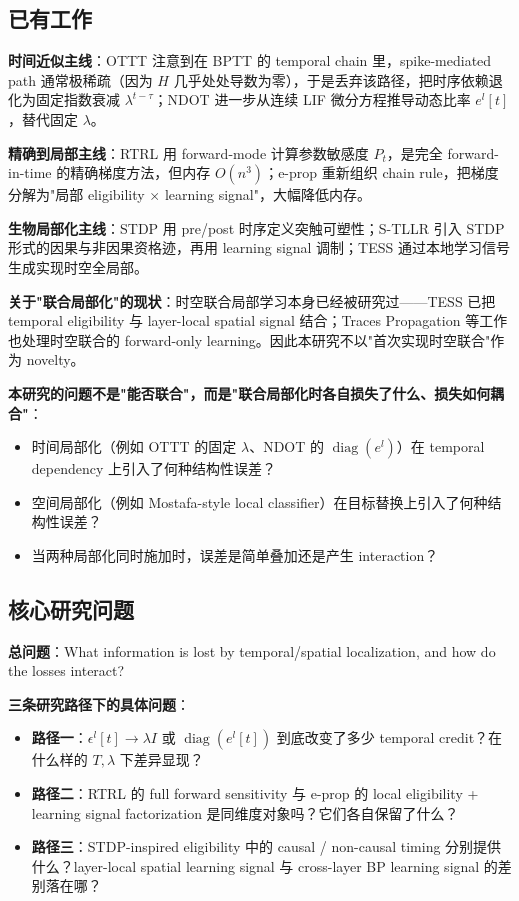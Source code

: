 \documentclass[journal,12pt,onecolumn]{IEEEtran}
\begin{document}
\subsection{已有工作}

\textbf{时间近似主线}：OTTT \cite{xiao_online_2022} 注意到在 BPTT 的 temporal chain 里，spike-mediated path 通常极稀疏（因为 $H$ 几乎处处导数为零），于是丢弃该路径，把时序依赖退化为固定指数衰减 $\lambda^{t-\tau}$；NDOT \cite{jiang_ndot_nodate} 进一步从连续 LIF 微分方程推导动态比率 $e^l[t]$，替代固定 $\lambda$。

\textbf{精确到局部主线}：RTRL \cite{williams1989learning} 用 forward-mode 计算参数敏感度 $P_t$，是完全 forward-in-time 的精确梯度方法，但内存 $O(n^3)$；e-prop \cite{bellec_solution_2020} 重新组织 chain rule，把梯度分解为"局部 eligibility $\times$ learning signal"，大幅降低内存。

\textbf{生物局部化主线}：STDP 用 pre/post 时序定义突触可塑性；S-TLLR \cite{apolinario_s-tllr_2024} 引入 STDP 形式的因果与非因果资格迹，再用 learning signal 调制；TESS \cite{apolinario_tess_2025} 通过本地学习信号生成实现时空全局部。

\textbf{关于"联合局部化"的现状}：时空联合局部学习本身已经被研究过——TESS \cite{apolinario_tess_2025} 已把 temporal eligibility 与 layer-local spatial signal 结合；Traces Propagation 等工作也处理时空联合的 forward-only learning。因此本研究不以"首次实现时空联合"作为 novelty。

\textbf{本研究的问题不是"能否联合"，而是"联合局部化时各自损失了什么、损失如何耦合"}：
\begin{itemize}[leftmargin=1.5em,itemsep=0pt]
\item 时间局部化（例如 OTTT 的固定 $\lambda$、NDOT 的 $\operatorname{diag}(e^l)$）在 temporal dependency 上引入了何种结构性误差？
\item 空间局部化（例如 Mostafa-style local classifier）在目标替换上引入了何种结构性误差？
\item 当两种局部化同时施加时，误差是简单叠加还是产生 interaction？
\end{itemize}

\subsection{核心研究问题}

\textbf{总问题}：What information is lost by temporal/spatial localization, and how do the losses interact?

\textbf{三条研究路径下的具体问题}：
\begin{itemize}[leftmargin=1.5em,itemsep=0pt]
\item \textbf{路径一}：$\epsilon^l[t]\to\lambda I$ 或 $\operatorname{diag}(e^l[t])$ 到底改变了多少 temporal credit？在什么样的 $T,\lambda$ 下差异显现？
\item \textbf{路径二}：RTRL 的 full forward sensitivity 与 e-prop 的 local eligibility + learning signal factorization 是同维度对象吗？它们各自保留了什么？
\item \textbf{路径三}：STDP-inspired eligibility 中的 causal / non-causal timing 分别提供什么？layer-local spatial learning signal 与 cross-layer BP learning signal 的差别落在哪？
\end{itemize}
\end{document}
